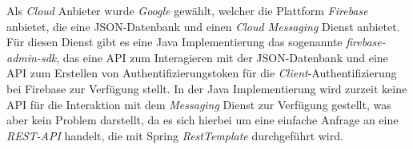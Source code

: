 \newline
\newline
Als \emph{Cloud} Anbieter wurde \emph{Google} gewählt, welcher die Plattform \emph{Firebase} anbietet, die eine JSON-Datenbank und einen \emph{Cloud Messaging} Dienst anbietet. Für diesen Dienst gibt es eine Java Implementierung das sogenannte \emph{firebase-admin-sdk}, das eine API zum Interagieren mit der JSON-Datenbank und eine API zum Erstellen von Authentifizierungstoken für die \emph{Client}-Authentifizierung bei Firebase zur Verfügung stellt. In der Java Implementierung wird zurzeit keine API für die Interaktion mit dem \emph{Messaging} Dienst zur Verfügung gestellt, was aber kein Problem darstellt, da es sich hierbei um eine einfache Anfrage an eine \emph{REST-API} handelt, die mit Spring \emph{RestTemplate} durchgeführt wird.